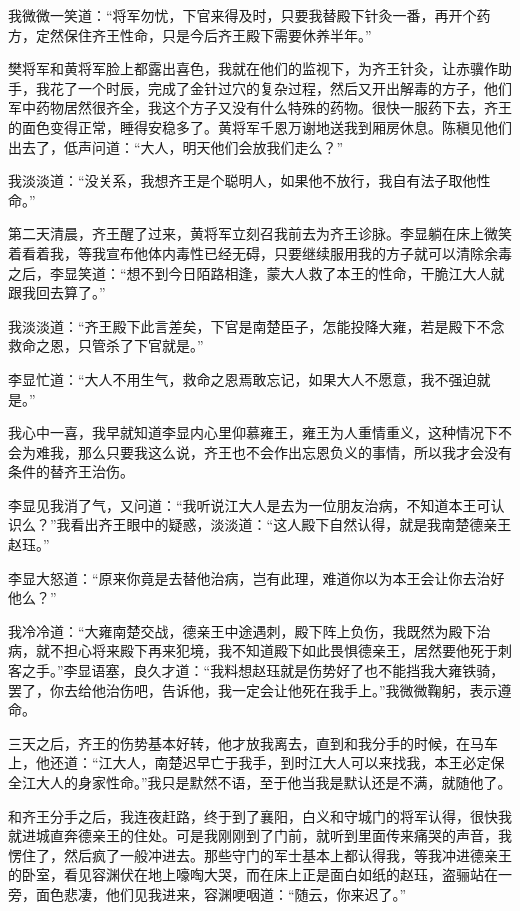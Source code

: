 我微微一笑道：“将军勿忧，下官来得及时，只要我替殿下针灸一番，再开个药方，定然保住齐王性命，只是今后齐王殿下需要休养半年。”

樊将军和黄将军脸上都露出喜色，我就在他们的监视下，为齐王针灸，让赤骥作助手，我花了一个时辰，完成了金针过穴的复杂过程，然后又开出解毒的方子，他们军中药物居然很齐全，我这个方子又没有什么特殊的药物。很快一服药下去，齐王的面色变得正常，睡得安稳多了。黄将军千恩万谢地送我到厢房休息。陈稹见他们出去了，低声问道：“大人，明天他们会放我们走么？”

我淡淡道：“没关系，我想齐王是个聪明人，如果他不放行，我自有法子取他性命。”

第二天清晨，齐王醒了过来，黄将军立刻召我前去为齐王诊脉。李显躺在床上微笑着看着我，等我宣布他体内毒性已经无碍，只要继续服用我的方子就可以清除余毒之后，李显笑道：“想不到今日陌路相逢，蒙大人救了本王的性命，干脆江大人就跟我回去算了。”

我淡淡道：“齐王殿下此言差矣，下官是南楚臣子，怎能投降大雍，若是殿下不念救命之恩，只管杀了下官就是。”

李显忙道：“大人不用生气，救命之恩焉敢忘记，如果大人不愿意，我不强迫就是。”

我心中一喜，我早就知道李显内心里仰慕雍王，雍王为人重情重义，这种情况下不会为难我，那么只要我这么说，齐王也不会作出忘恩负义的事情，所以我才会没有条件的替齐王治伤。

李显见我消了气，又问道：“我听说江大人是去为一位朋友治病，不知道本王可认识么？”我看出齐王眼中的疑惑，淡淡道：“这人殿下自然认得，就是我南楚德亲王赵珏。”

李显大怒道：“原来你竟是去替他治病，岂有此理，难道你以为本王会让你去治好他么？”

我冷冷道：“大雍南楚交战，德亲王中途遇刺，殿下阵上负伤，我既然为殿下治病，就不担心将来殿下再来犯境，我不知道殿下如此畏惧德亲王，居然要他死于刺客之手。”李显语塞，良久才道：“我料想赵珏就是伤势好了也不能挡我大雍铁骑，罢了，你去给他治伤吧，告诉他，我一定会让他死在我手上。”我微微鞠躬，表示遵命。

三天之后，齐王的伤势基本好转，他才放我离去，直到和我分手的时候，在马车上，他还道：“江大人，南楚迟早亡于我手，到时江大人可以来找我，本王必定保全江大人的身家性命。”我只是默然不语，至于他当我是默认还是不满，就随他了。

和齐王分手之后，我连夜赶路，终于到了襄阳，白义和守城门的将军认得，很快我就进城直奔德亲王的住处。可是我刚刚到了门前，就听到里面传来痛哭的声音，我愣住了，然后疯了一般冲进去。那些守门的军士基本上都认得我，等我冲进德亲王的卧室，看见容渊伏在地上嚎啕大哭，而在床上正是面白如纸的赵珏，盗骊站在一旁，面色悲凄，他们见我进来，容渊哽咽道：“随云，你来迟了。”

